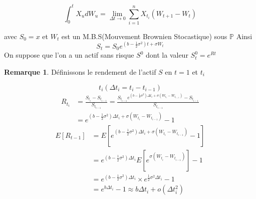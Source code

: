 \documentclass{article}
\theoremstyle{plain}
\theoremstyle{definition}
\newtheorem{remq}[thm]{Remarque}
\begin{document}
\begin{equation}
\int_0^t X_u dW_u=\lim_{\Delta t\rightarrow 0}\sum_{i=1}^{n}X_{t_i}(W_{t+1}-W_t)
\end{equation}

avec $S_0=x$ et $W_t$ est un M.B.S(Mouvement Brownien Stocastique) sous $\mathbb{P}$
Ainsi
\begin{equation}
S_t=S_0e^{(b-\frac{1}{2}\sigma^2)t+\sigma W_t}
\end{equation}
On suppose que l'on a un actif sans risque $S^0$ dont la valeur $S_t^0=e^{Rt}$
\begin{remq}
	D\'efinissons le rendement de l'actif $S$ en $t=1$ et $t_i$
\end{remq}
\begin{equation}
t_i(\Delta t_i=t_i-t_{i-1})
\end{equation}
\begin{equation}
\begin{split}
R_{t_i}&=\frac{S_{t_i}-S_{t_{i-1}}}{S_{t_{i-1}}}=\frac{S_{t_{i-1}}e^{(b-\frac{1}{2}\sigma^2)\Delta t_i+\sigma(W_{t_i}-W_{t_{i-1}})}-S_{t_{i-1}}}{S_{t_{i-1}}}\\
&=e^{(b-\frac{1}{2}\sigma^2)\Delta t_i+\sigma(W_{t_i}-W_{t_{i-1}})}-1
\end{split}
\end{equation}
\begin{equation}
\begin{split}
E[R_{t-1}]&=E[e^{(b-\frac{1}{2}\sigma^2)\Delta t_i+\sigma(W_{t_i}-W_{t_{i-1}})}-1]\\
&=e^{(b-\frac{1}{2}\sigma^2)\Delta t_i} E[e^{\sigma(W_{t_i}-W_{t_{i-1}})}]-1\\
&=e^{(b-\frac{1}{2}\sigma^2)\Delta t_i}\times e^{\frac{1}{2}\sigma^2\Delta t_i}-1\\
&=e^{b\Delta t_i}-1\approx b\Delta t_i+o(\Delta t_i^2)
\end{split}
\end{equation}
\end{document}
